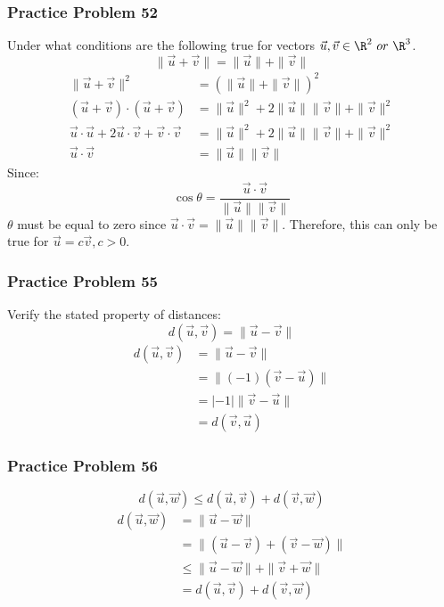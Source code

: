 \documentclass[letterpaper, 12pt]{math}
\begin{document}
\subsubsection*{Practice Problem 52}
Under what conditions are the following true for vectors \( \vec{u},\vec{v}
\in\R^2\ or\ \R^3 \).
\[ \|\vec{u}+\vec{v}\| = \|\vec{u}\|+\|\vec{v}\| \]
\begin{align*}
  \|\vec{u}+\vec{v}\|^2 &= (\|\vec{u}\|+\|\vec{v}\|)^2 \\
  (\vec{u}+\vec{v})\cdot(\vec{u}+\vec{v}) &= \|\vec{u}\|^2+
    2\|\vec{u}\|\|\vec{v}\|+\|\vec{v}\|^2 \\
  \vec{u}\cdot\vec{u}+2\vec{u}\cdot\vec{v}+\vec{v}\cdot\vec{v} &=
    \|\vec{u}\|^2+2\|\vec{u}\|\|\vec{v}\|+\|\vec{v}\|^2 \\
  \vec{u}\cdot\vec{v} &= \|\vec{u}\|\|\vec{v}\|
\end{align*}
Since:
\[ \cos\theta = \frac{\vec{u}\cdot\vec{v}}{\|\vec{u}\|\|\vec{v}\|} \]
\( \theta \) must be equal to zero since \( \vec{u}\cdot\vec{v} =
\|\vec{u}\|\|\vec{v}\| \). Therefore, this can only be true for \( \vec{u} =
c\vec{v}, c > 0 \).

\subsubsection*{Practice Problem 55}
Verify the stated property of distances:
\[ d(\vec{u},\vec{v}) = \|\vec{u}-\vec{v}\| \]
\begin{align*}
  d(\vec{u},\vec{v}) &= \|\vec{u}-\vec{v}\| \\
  &= \|(-1)(\vec{v}-\vec{u})\| \\
  &= |-1|\|\vec{v}-\vec{u}\| \\
  &= d(\vec{v},\vec{u})
\end{align*}

\subsubsection*{Practice Problem 56}
\[ d(\vec{u},\vec{w}) \le d(\vec{u},\vec{v})+d(\vec{v},\vec{w}) \]
\begin{align*}
  d(\vec{u},\vec{w}) &= \|\vec{u}-\vec{w}\| \\
  &= \|(\vec{u}-\vec{v})+(\vec{v}-\vec{w})\| \\
  &\le \|\vec{u}-\vec{w}\|+\|\vec{v}+\vec{w}\| \\
  &= d(\vec{u},\vec{v})+d(\vec{v},\vec{w})
\end{align*}
\end{document}
